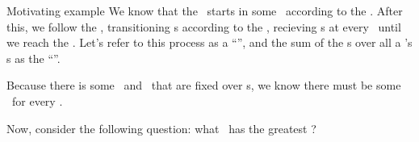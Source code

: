 \documentclass{rl_theory/rl_theory}
\begin{document}
\begin{part} {Motivating example}
  We know that the \agt\ starts in some \til\ according to the \ind.
  After this, we follow the \str, 
  transitioning \til{}s according to the \trd, recieving \rwd{}s 
  at every \til\ until
  we reach the \lmt. Let's refer to this process as a ``\run'', and
  the sum of the \rwd{}s over all a \run's \til{}s
  as the ``\trwd''.

  Because there is some \ind\ and \trd\ 
  that are fixed over \run{}s, 
  we know there must be 
  some \atrwd\ for every \str.

  Now, consider the following question: 
  what \str\ has the greatest \atrwd?
\end{part}
\end{document}

